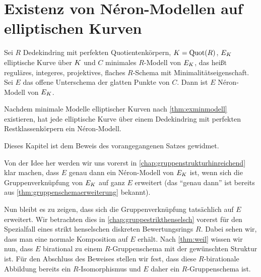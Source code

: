 \chapter{Existenz von Néron-Modellen auf elliptischen Kurven}
\label{chap:exneronmodelle}
\begin{Satz}\label{thm:exneronmodelle}

  Sei $R$ Dedekindring mit perfekten Quotientenkörpern,
  $K=\operatorname{Quot}(R)$, $E_{K}$ elliptische Kurve über $K$ und $C$ minimales
  $R$-Modell von $E_{K}$,
  das heißt reguläres, integeres, projektives,
  flaches $R$-Schema mit Minimalitätseigenschaft.
  Sei $E$ das offene Unterschema der glatten Punkte von $C$.
  Dann ist $E$ Néron-Modell von $E_{K}$.

  Nachdem minimale Modelle elliptischer
  Kurven nach \ref{thm:exminmodell} existieren, hat jede
  elliptische Kurve über einem Dedekindring mit perfekten
  Restklassenkörpern ein Néron-Modell.
\end{Satz}
Dieses Kapitel ist dem Beweis des vorangegangenen Satzes gewidmet.

Von der Idee her werden wir uns vorerst in
\autoref{chap:gruppenstrukturhinreichend} klar machen, dass $E$ genau 
dann ein Néron-Modell von $E_{K}$ ist, wenn sich die Gruppenverknüpfung
von $E_{K}$ auf ganz $E$ erweitert (das \enquote{genau dann} ist
bereits aus \ref{thm:gruppenschemaerweiterung} bekannt).

Nun bleibt es zu zeigen, dass sich die Gruppenverknüpfung tatsächlich
auf $E$ erweitert.
Wir betrachten dies in \autoref{chap:gruppestrikthenselsch} vorerst für
den Spezialfall eines strikt henselschen diskreten Bewertungsrings
$R$. Dabei sehen wir, dass man eine normale Komposition auf $E$
erhält. Nach \ref{thm:weil} wissen wir nun, dass $E$ birational zu
einem $R$-Gruppenschema mit der gewünschten Struktur ist. Für den
Abschluss des Beweises stellen wir fest, dass
diese $R$-birationale Abbildung bereits ein $R$-Isomorphismus und $E$
daher ein $R$-Gruppenschema ist.

